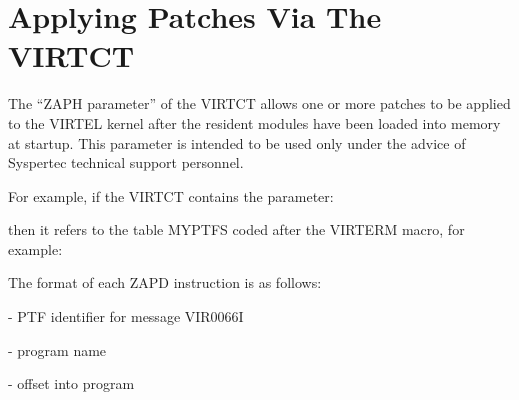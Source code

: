 \documentclass[letterpaper,10pt,english]{sphinxmanual}
\begin{document}
\section{Applying Patches Via The VIRTCT}
\label{\detokenize{Installation_Guide:applying-patches-via-the-virtct}}
The “ZAPH parameter” of the VIRTCT allows one or more patches to be applied to the VIRTEL kernel after the resident modules have been loaded into memory at startup. This parameter is intended to be used only under the advice of Syspertec technical support personnel.

For example, if the VIRTCT contains the parameter:

\begin{sphinxVerbatim}[commandchars=\\\{\}]
 
\end{sphinxVerbatim}

then it refers to the table MYPTFS coded after the VIRTERM macro, for example:

\begin{sphinxVerbatim}[commandchars=\\\{\}]
   
  
   
\end{sphinxVerbatim}

The format of each ZAPD instruction is as follows:

\begin{sphinxVerbatim}[commandchars=\\\{\}]
  
\end{sphinxVerbatim}

 - PTF identifier for message VIR0066I

 - program name

 - offset into program
\end{document}
